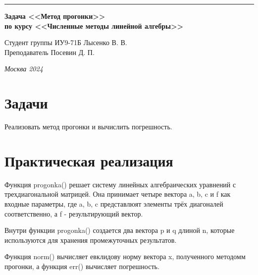 \documentclass[a4paper, 14pt]{extarticle}
\begin{document}
\begin{titlepage}
\vspace*{-16pt}
\hspace{30pt}\rule{0.866\textwidth}{0.4pt}
  
\vspace{11em}

\begin{center}
\Large {\bf Задача <<Метод прогонки>>} \\ 
\large {\bf по курсу <<Численные методы линейной алгебры>>} \\ 
\end{center}\normalsize

\vspace{8em}


\begin{flushright}
  {Студент группы ИУ9-71Б Лысенко В. В.\hspace*{15pt} \\
  \vspace{2ex}
  Преподаватель Посевин Д. П.\hspace*{15pt}}
\end{flushright}

\bigskip

\vfill
 

\begin{center}
\textsl{Москва 2024}
\end{center}
\end{titlepage}

\renewcommand{\ttdefault}{pcr}

\setlength{\tabcolsep}{3pt}
\newpage
\setcounter{page}{2}

\section{Задачи}\label{Sect::task}
\par
\renewcommand{\labelenumii}{\arabic{enumi}.\arabic{enumii}.}
\begin{enumerate} 
Реализовать метод прогонки и вычислить погрешность.
\end{enumerate}


\section{Практическая реализация}
\par

Функция progonka() решает систему линейных алгебраических уравнений с трехдиагональной матрицей. Она принимает четыре вектора a, b, c и f как входные параметры, где a, b, c представлюят элементы трёх диагоналей соответственно, а f - результирующий вектор.
\par
Внутри функции progonka() создается два вектора p и q длиной n, которые используются для хранения промежуточных результатов.
\par
Функция norm() вычисляет евклидову норму вектора x, полученного методомм прогонки, а функция err() вычисляет погрешность.
\end{document}
